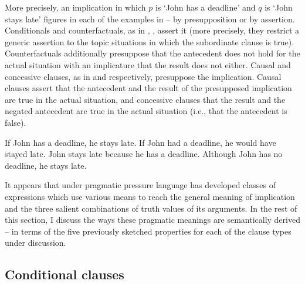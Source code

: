 \documentclass[output=paper,
colorlinks,
citecolor=brown,
newtxmath
]{langscibook}
\begin{document}
More precisely, an implication in which $p$ is `John has a deadline' and $q$ is `John stays late' figures in each of the examples in  -- by presupposition or by assertion. Conditionals and counterfactuals, as in , , assert it (more precisely, they restrict a generic assertion to the topic situations in which the subordinate clause is true). Counterfactuals additionally presuppose that the antecedent does not hold for the actual situation with an implicature that the result does not either. Causal and concessive clauses, as in  and  respectively, presuppose the implication. Causal clauses assert that the antecedent and the result of the presupposed implication are true in the actual situation, and concessive clauses that the result and the negated antecedent are true in the actual situation (i.e., that the antecedent is false).

\ea\label{ex:Logic}
\ea If John has a deadline, he stays late.\label{ex:Logic-a}
\ex If John had a deadline, he would have stayed late.\label{ex:Logic-b}
\ex John stays late because he has a deadline.\label{ex:Logic-c}
\ex Although John has no deadline, he stays late.\label{ex:Logic-d}
\z\z

\noindent It appears that under pragmatic pressure language has developed classes of expressions which use various means to reach the general meaning of implication and the three salient combinations of truth values of its arguments. In the rest of this section, I discuss the ways these pragmatic meanings are semantically derived -- in terms of the five previously sketched properties for each of the clause types under discussion.

\subsection{Conditional clauses}
\end{document}
